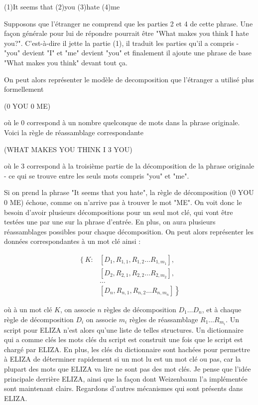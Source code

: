 \documentclass[11pt, a4paper]{report}
\begin{document}
  \begin{center}
    (1)It seems that (2)you (3)hate (4)me
  \end{center} 
  
  Supposons que l'étranger ne comprend que les parties 2 et 4 de cette phrase. Une façon générale 
  pour lui de répondre pourrait être "What makes you think I hate you?". C'est-à-dire il jette la partie (1), 
  il traduit les parties qu'il a compris - "you" devient "I" et "me" devient "you" et finalement il 
  ajoute une phrase de base "What makes you think" devant tout ça. 

  On peut alors représenter le modèle de decomposition que l'étranger a utilisé plus formellement 

  \begin{center}
    (0 YOU 0 ME)
  \end{center} 

  où le 0 correspond à un nombre quelconque de mots dans la phrase originale. 
  Voici la règle de réassamblage correspondante

  \begin{center}
    (WHAT MAKES YOU THINK I 3 YOU)
  \end{center} 
  
  où le 3 correspond à la troisième partie de la décomposition de la phrase originale 
  - ce qui se trouve entre les seuls mots compris "you" et "me". 
   
  Si on prend la phrase "It seems that you hate", la règle de décomposition 
  (0 YOU 0 ME) échoue, comme on n'arrive pas à trouver le mot "ME". On voit donc le 
  besoin d'avoir plusieurs décompositions pour un seul mot clé, qui vont être testées 
  une par une sur la phrase d'entrée. En plus, on aura plusieurs réassamblages possibles pour 
  chaque décomposition. On peut alors représenter les données correspondantes à un mot clé 
  ainsi : 

  \begin{align*}
    \left\{ K: \right. 
    &\left[ D_{1}, R_{1, 1}, R_{1, 2} \ldots R_{1, m_{1}} \right], \\
    &\left[ D_{2}, R_{2, 1}, R_{2, 2} \ldots R_{2, m_{2}} \right], \\
    &\ldots \\
    &\left. \left[ D_{n}, R_{n, 1}, R_{n, 2} \ldots R_{n, m_{n}} \right] \right\}
  \end{align*}

  où à un mot clé $K$, on associe $n$ règles de décomposition $D_{1} \ldots D_{n}$, et à 
  chaque règle de décomposition $D_{i}$ on associe $m_{i}$ règles de réassamblage 
  $R_{1} \ldots R_{m_{i}}$. Un script pour ELIZA 
  n'est alors qu'une liste de telles structures. Un dictionnaire qui a comme clés 
  les mots clés du script est construit une fois que le script est chargé par ELIZA. 
  En plus, les clés du dictionnaire sont hachées pour permettre à ELIZA de déterminer 
  rapidement si un mot lu est un mot clé ou pas, car la plupart des mots que ELIZA va lire 
  ne sont pas des mot clés. Je pense que l'idée principale derrière ELIZA, ainsi 
  que la façon dont Weizenbaum l'a implémentée sont maintenant clairs. Regardons 
  d'autres mécanismes qui sont présents dans ELIZA.
\end{document}
